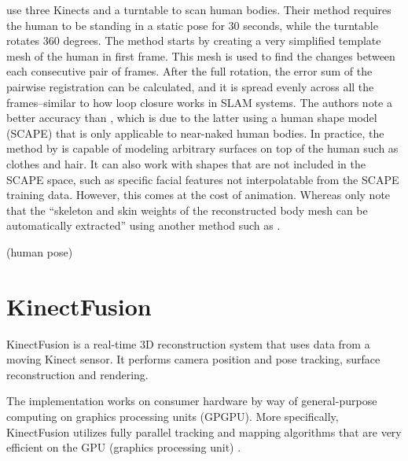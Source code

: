 \citet{tongscanning} use three Kinects and a turntable to scan human bodies. Their method requires the human to be standing in a static pose for 30 seconds, while the turntable rotates 360 degrees. The method starts by creating a very simplified template mesh of the human in first frame. This mesh is used to find the changes between each consecutive pair of frames. After the full rotation, the error sum of the pairwise registration can be calculated, and it is spread evenly across all the frames--similar to how loop closure works in SLAM systems. The authors note a better accuracy than \citep{weiss2011home}, which is due to the latter using a human shape model (SCAPE) that is only applicable to near-naked human bodies. In practice, the method by \citeauthor{tongscanning} is capable of modeling arbitrary surfaces on top of the human such as clothes and hair. It can also work with shapes that are not included in the SCAPE space, such as specific facial features not interpolatable from the SCAPE training data. However, this comes at the cost of animation. Whereas  \citet{tongscanning} only note that the ``skeleton and skin weights of the reconstructed body mesh can be automatically extracted'' using another method such as \citep{baran2007automatic}.

\citep{charpentier2011accurate}


(human pose)
\citep{baak2011data}

\section{KinectFusion}

KinectFusion is a real-time 3D reconstruction system that uses data from a moving Kinect sensor. It performs camera position and pose tracking, surface reconstruction and rendering. \citep{izadi2011kinectfusion}

The implementation works on consumer hardware by way of general-purpose computing on graphics processing units (GPGPU). More specifically, KinectFusion utilizes fully parallel tracking and mapping algorithms that are very efficient on the GPU (graphics processing unit) \citep{newcombe2011kinectfusion}.

